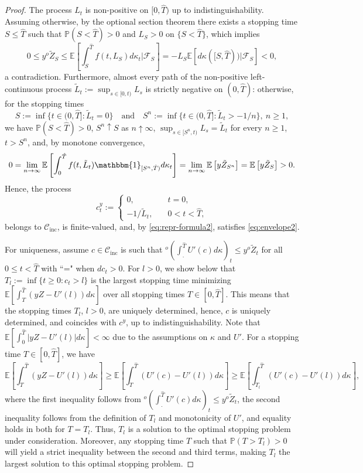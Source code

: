 \documentclass[11pt, oneside]{article}   	%
\theoremstyle{plain}
\theoremstyle{definition}
\theoremstyle{remark}
\begin{document}
\begin{appendix}
\begin{proof}
The process $L_t$ is non-positive on $[0,\hat{T})$ up to indistinguishability. Assuming otherwise, by the optional section theorem there exists a stopping time $S\leq\hat{T}$ such that $\mathbb{P}(S<\hat{T})>0$ and $L_S>0$ on $\{S<\hat{T}\}$, which implies
$$0\leq y{}^o\tilde{Z}_S\leq \mathbb{E}\left[\int_S^{\hat{T}} f(t,L_S)d\kappa_t\Big\vert \mathcal{F}_S\right]=-L_S\mathbb{E}\left[d\kappa([S,\hat{T}))\Big\vert \mathcal{F}_S\right]<0,$$
a contradiction. Furthermore, almost every path of the non-positive left-continuous process $\tilde{L}_t:=\sup_{s\in[0,t)}L_s$ is strictly negative on $(0,\hat{T})$: otherwise, for the stopping times
$$S:=\inf\{t\in(0,\hat{T}]: \tilde{L}_t=0\}\quad\text{and}\quad S^n:=\inf\{t\in(0,\hat{T}]:\tilde{L}_t>-1/n\},\ n\geq 1,$$
 we have $\mathbb{P}(S<\hat{T})>0$, $S^n\uparrow S$ as $n\uparrow\infty$, $\sup_{s\in[S^n,t)}L_s=\tilde{L}_t$ for every $n\geq 1$, $t>S^n$, and, by monotone convergence,
$$0=\lim_{n\to\infty}\mathbb{E}\left[\int_{0}^{\hat{T}} f(t,\tilde{L}_t)\mathbbm{1}_{[S^n,\hat{T})}d\kappa_t\right]=\lim_{n\to\infty}\mathbb{E}\left[y\tilde{Z}_{S^n}\right]=\mathbb{E}\left[y\tilde{Z}_{S}\right]>0.$$
Hence, the process
$$c^y_t:=\begin{cases}
0,&\quad t=0,\\
-1/\tilde{L}_t,&\quad 0<t<\hat{T},
\end{cases}$$
belongs to $\mathcal{C}_{\text{inc}}$, is finite-valued, and, by \eqref{eq:repr-formula2}, satisfies \eqref{eq:envelope2}.

For uniqueness, assume $c\in\mathcal{C}_{\text{inc}}$ is such that $^o\left(\int_.^{\hat{T}} U'(c) d\kappa\right)_t\leq y{}^o\tilde{Z}_t$ for all $0\leq t<\hat{T}$ with ``=" when $dc_t>0$. For $l>0$, we show below that $T_l:=\inf\{t\geq 0: c_t>l\}$ is the largest stopping time minimizing $\mathbb{E}\left[\int_T^{\hat{T}} (yZ-U'(l))d\kappa\right]$ over all stopping times $T\in[0,\hat{T}]$. This means that the stopping times $T_l$, $l>0$, are uniquely determined, hence, $c$ is uniquely determined, and coincides with $c^y$, up to indistinguishability. Note that $\mathbb{E}\left[\int_0^{\hat{T}}\vert yZ-U'(l)\vert d\kappa\right]<\infty$ due to the assumptions on $\kappa$ and $U'$. For a stopping time $T\in[0,\hat{T}]$, we have
$$\mathbb{E}\left[\int_T^{\hat{T}}(yZ-U'(l)) d\kappa\right]\geq \mathbb{E}\left[\int_T^{\hat{T}}(U'(c)-U'(l)) d\kappa\right]\geq\mathbb{E}\left[\int_{T_l}^{\hat{T}}(U'(c)-U'(l)) d\kappa\right],$$
where the first inequality follows from $^o\left(\int_.^{\hat{T}} U'(c) d\kappa\right)_t\leq y{}^o\tilde{Z}_t$, the second inequality follows from the definition of $T_l$ and monotonicity of $U'$, and equality holds in both for $T=T_l$. Thus, $T_l$ is a solution to the optimal stopping problem under consideration. Moreover, any stopping time $T$ such that $\mathbb{P}(T>T_l)>0$ will yield a strict inequality between the second and third terms, making $T_l$ the largest solution to this optimal stopping problem.
\end{proof}


\end{appendix}
\end{document}
